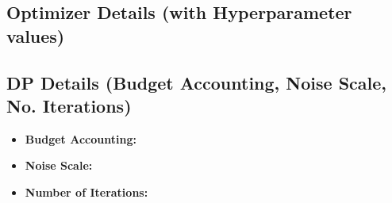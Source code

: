 \subsection{Optimizer Details (with Hyperparameter values)}\label{subsec:optimizer-details}

\subsection{DP Details (Budget Accounting, Noise Scale, No. Iterations)}\label{subsec:dp-details}
\begin{itemize}
    \item \textbf{Budget Accounting:} 
    \item \textbf{Noise Scale:}
    \item \textbf{Number of Iterations:}
\end{itemize}